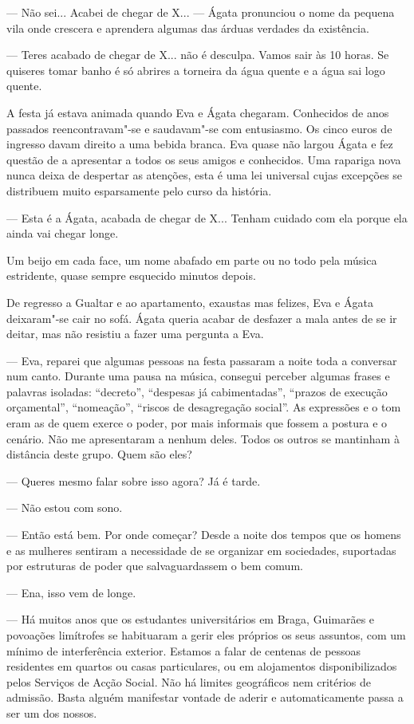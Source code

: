 --- Não sei... Acabei de chegar de X... --- Ágata pronunciou o nome da
  pequena vila onde crescera e aprendera algumas das árduas verdades
  da existência.

--- Teres acabado de chegar de X... não é desculpa. Vamos sair às 10
  horas. Se quiseres tomar banho é só abrires a torneira da água quente
  e a água sai logo quente.

A festa já estava animada quando Eva e Ágata chegaram. Conhecidos de
anos passados reencontravam"-se e saudavam"-se com entusiasmo. Os cinco
euros de ingresso davam direito a uma bebida branca. Eva quase não
largou Ágata e fez questão de a apresentar a todos os seus amigos e
conhecidos. Uma rapariga nova nunca deixa de despertar as atenções,
esta é uma lei universal cujas excepções se distribuem muito esparsamente pelo
curso da história.

--- Esta é a Ágata, acabada de chegar de X... Tenham cuidado com ela
  porque ela ainda vai chegar longe.

Um beijo em cada face, um nome abafado em parte ou no todo pela música
estridente, quase sempre esquecido minutos depois.

De regresso a Gualtar e ao apartamento, exaustas mas felizes, Eva e
Ágata deixaram"-se cair no sofá. Ágata queria acabar de desfazer a mala
antes de se ir deitar, mas não resistiu a fazer uma pergunta a Eva.

--- Eva, reparei que algumas pessoas na festa passaram a noite toda a
  conversar num canto. Durante uma pausa na música, consegui perceber
  algumas frases e palavras isoladas: ``decreto'', ``despesas já
  cabimentadas'', ``prazos de execução orçamental'', ``nomeação'',
  ``riscos de desagregação social''. As expressões e o tom eram as de
  quem exerce o poder, por mais informais que fossem a postura e o
  cenário. Não me apresentaram a nenhum deles. Todos os outros se
  mantinham à distância deste grupo. Quem são eles?

--- Queres mesmo falar sobre isso agora? Já é tarde.

--- Não estou com sono.

--- Então está bem. Por onde começar? Desde a noite dos tempos que os
  homens e as mulheres sentiram a necessidade de se organizar em
  sociedades, suportadas por estruturas de poder que salvaguardassem o
  bem comum.

--- Ena, isso vem de longe.

--- Há muitos anos que os estudantes universitários em Braga, Guimarães e
  povoações limítrofes se habituaram a gerir eles próprios os seus
  assuntos, com um mínimo de interferência exterior. Estamos a falar
  de centenas de pessoas residentes em quartos ou casas
  particulares, ou em alojamentos disponibilizados
pelos Serviços de Acção Social. Não há limites geográficos nem
critérios de admissão. Basta alguém manifestar vontade de aderir e
automaticamente passa a ser um dos nossos.

